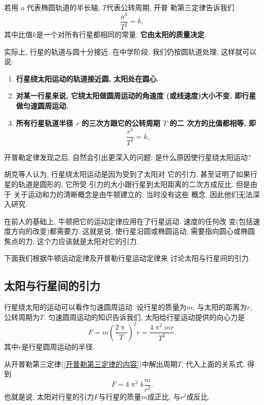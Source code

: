 \documentclass[11pt,a4paper]{ctexbook}
\begin{document}
若用 $a$ 代表椭圆轨道的半长轴, $T$代表公转周期, 开普
勒第三定律告诉我们
\begin{equation*}
    \frac{a^3}{T^2} = k,
\end{equation*}
其中比值$k$是一个对所有行星都相同的常量.
\textbf{它由太阳的质量决定}.

实际上, 行星的轨道与圆十分接近. 在中学阶段, 我们仍按圆轨道处理, 这样就可以说:
\begin{enumerate}
	\setlength{\itemsep}{0pt}
	\setlength{\parsep}{0pt}
	\setlength{\parskip}{0pt}
	\item \textbf{行星绕太阳运动的轨道接近圆, 太阳处在圆心.}
	\item \textbf{对某一行星来说, 它绕太阳做圆周运动的角速度
	      (或线速度)大小不变, 即行星做匀速圆周运动.}
	\item \textbf{所有行星轨道半径 $r$ 的三次方跟它的公转周期 $T$ 的二
	      次方的比值都相等, 即}
          \begin{equation}
            \frac{r^3}{T^2} = k,
            \label{开普勒第三定律的内容}
        \end{equation}
\end{enumerate}

开普勒定律发现之后, 自然会引出更深入的问题: 是什么原因使行星绕太阳运动?

胡克等人认为, 行星绕太阳运动是因为受到了太阳对
它的引力, 甚至证明了如果行星的轨道是圆形的, 它所受
引力的大小跟行星到太阳距离的二次方成反比. 但是由于
关于运动和力的清晰概念是由牛顿建立的, 当时没有这些
概念, 因此他们无法深入研究.

在前人的基础上, 牛顿把它的运动定律应用在了行星运动. 速度的任何改
变(包括速度方向的改变)都需要力. 这就是说,
使行星沿圆或椭圆运动, 需要指向圆心或椭圆焦点的力,
这个力应该就是太阳对它的引力.

下面我们根据牛顿运动定律及开普勒行星运动定律来
讨论太阳与行星间的引力.

\subsection{太阳与行星间的引力}

行星绕太阳的运动可以看作匀速圆周运动. 设行星的质量为$m$,
与太阳的距离为$r$, 公转周期为$T$.
匀速圆周运动的知识告诉我们, 太阳给行星运动提供的向心力是
$$F = m\left(\frac{2\uppi}{T}\right)^2r = \frac{4\uppi^2mr}{T^2}.$$
其中$r$是行星圆周运动的半径.

从开普勒第三定律(\ref{开普勒第三定律的内容})中解出周期$T$, 代入上面的关系式, 得到
$$F = 4\uppi^2k\frac{m}{r^2}.$$
也就是说, 太阳对行星的引力$F$与行星的质量$m$成正比, 与$r^2$成反比.
\end{document}
